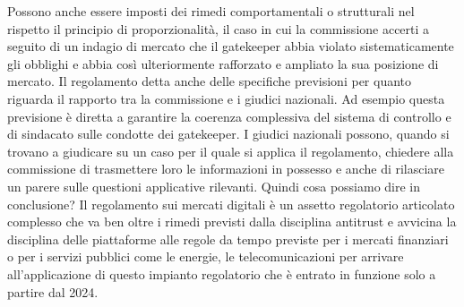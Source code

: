 Possono anche essere imposti dei rimedi comportamentali o strutturali nel rispetto il principio di proporzionalità, il caso in cui la commissione accerti a seguito di un indagio di mercato che il gatekeeper abbia violato sistematicamente gli obblighi e abbia così ulteriormente rafforzato e ampliato la sua posizione di mercato.
Il regolamento detta anche delle specifiche previsioni per quanto riguarda il rapporto tra la commissione e i giudici nazionali.
Ad esempio questa previsione è diretta a garantire la coerenza complessiva del sistema di controllo e di sindacato sulle condotte dei gatekeeper.
I giudici nazionali possono, quando si trovano a giudicare su un caso per il quale si applica il regolamento, chiedere alla commissione di trasmettere loro le informazioni in possesso e anche di rilasciare un parere sulle questioni applicative rilevanti.
Quindi cosa possiamo dire in conclusione?
Il regolamento sui mercati digitali è un assetto regolatorio articolato complesso che va ben oltre i rimedi previsti dalla disciplina antitrust e avvicina la disciplina delle piattaforme alle regole da tempo previste per i mercati finanziari o per i servizi pubblici come le energie, le telecomunicazioni per arrivare all'applicazione di questo impianto regolatorio che è entrato in funzione solo a partire dal 2024.
